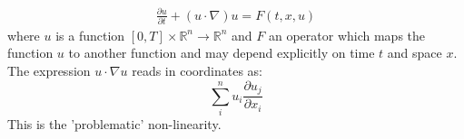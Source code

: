 \documentclass[17pt]{extarticle}
\begin{document}
\begin{align*}
	\frac{\partial{u}}{\partial{t}}+(u\cdot\nabla) u=F(t,x, u)
\end{align*}
where $u$ is a function $[0,T]\times\mathbb{R}^n\rightarrow\mathbb{R}^n$ and
$F$ an operator which maps the function $u$ to another function and may depend explicitly on time $t$ and space $x$.
The expression $u\cdot\nabla u$ reads in coordinates as:
$$
\sum_i^n u_i\frac{\partial u_j}{\partial x_i}
$$
This is the 'problematic' non-linearity.
\end{document}
